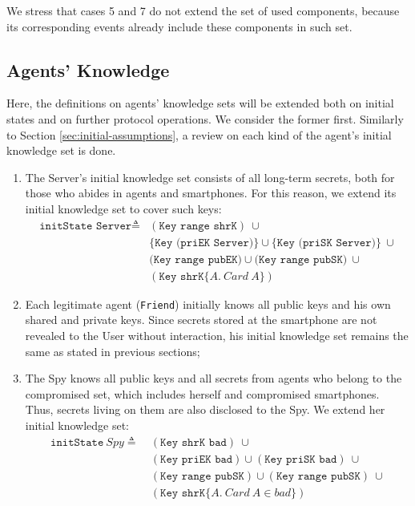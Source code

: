 We stress that cases 5 and 7 do not extend the set of used components, because its corresponding events already include these components in such set.





\subsection{Agents' Knowledge}


Here, the definitions on agents' knowledge sets will be extended both on initial states and on further protocol operations. We consider the former first. Similarly to Section \ref{sec:initial-assumptions}, a review on each kind of the agent's initial knowledge set is done.

\begin{enumerate}
  \item The Server's initial knowledge set consists of all long-term secrets, both for those who abides in agents and smartphones. For this reason, we extend its initial knowledge set to cover such keys:
  \begin{equation*}
    \begin{split}
      \texttt{initState Server} \triangleq
      & (\texttt{Key range shrK}) \  \cup \\
      & \{\texttt{Key (priEK Server)}\} \cup \{\texttt{Key (priSK Server)}\}\  \cup \\
      & \texttt{(Key range pubEK)} \cup \texttt{(Key range pubSK)}\ \cup \\
      & (\texttt{Key shrK}\{A.\ Card\ A\})
    \end{split}
  \end{equation*}
  \item Each legitimate agent (\texttt{Friend}) initially knows all public keys and his own shared and private keys. Since secrets stored at the smartphone are not revealed to the User without interaction, his initial knowledge set remains the same as stated in previous sections;

  \item The Spy knows all public keys and all secrets from agents who belong to the compromised set, which includes herself and compromised smartphones. Thus, secrets living on them are also disclosed to the Spy. We extend her initial knowledge set:
  \begin{equation*}
    \begin{split}
      \texttt{initState}\ Spy \triangleq \
      & (\texttt{Key shrK bad}) \ \cup \\
      & (\texttt{Key priEK bad}) \cup (\texttt{Key priSK bad}) \ \cup \\
      & (\texttt{Key range pubSK}) \cup (\texttt{Key range pubSK})\ \cup \\
      & (\texttt{Key shrK}\{A.\ Card\ A \in bad\})
    \end{split}
  \end{equation*}
\end{enumerate}

